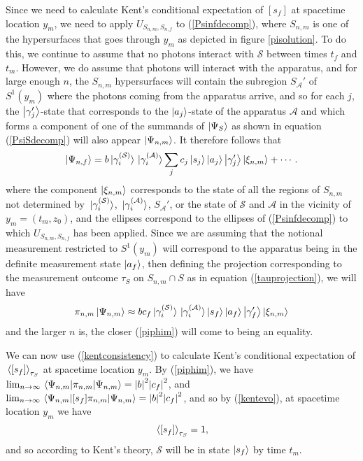Since we need to calculate Kent's conditional expectation of $[s_f]$ at spacetime location $y_m$, we need to apply  $U_{S_{n,m},S_{n,f}}$ to (\ref{Psinfdecomp}), where $S_{n,m}$ is one of the hypersurfaces that goes through $y_m$ as depicted in figure \ref{pisolution}. To do this, we continue to assume that no photons interact with $\mathcal{S}$ between times $t_f$ and $t_m$. However, we do assume that photons will interact with the apparatus, and for large enough $n$, the $S_{n,m}$ hypersurfaces will contain the subregion $S_{\mathcal{A}}'$ of $S^1(y_m)$ where the photons coming from the apparatus arrive, and so for each $j$, the $\ket{\gamma_j'}$-state that corresponds to the $\ket{a_j}$-state of the apparatus $\mathcal{A}$ and which forms a component of one of the summands of $\ket{\Psi_S}$ as shown in equation (\ref{PsiSdecomp}) will also appear $\ket{\Psi_{n,m}}$. It therefore follows that 
\begin{equation}\label{Psinfdecomp}
	\ket{\Psi_{n,f}}=b\ket*{\gamma_i^{(\mathcal{S})}}\ket*{\gamma_i^{(\mathcal{A})}}\sum_j c_j \ket{s_j}\ket{a_j}\ket{\gamma_j'}\ket{\xi_{n,m}}+\cdots.
\end{equation} 
where the component $\ket{\xi_{n,m}}$ corresponds to the state of all the regions of $S_{n,m}$ not determined by $\ket*{\gamma_i^{(\mathcal{S})}}$, $\ket*{\gamma_i^{(\mathcal{A})}}$,  $S_{\mathcal{A}}'$, or the state of $\mathcal{S}$ and $\mathcal{A}$ in the vicinity of $y_m=(t_m, z_0)$, and the ellipses correspond to the ellipses of (\ref{Psinfdecomp}) to which $U_{S_{n,m},S_{n,f}}$ has been applied. Since we are assuming that the notional measurement restricted to $S^1(y_m)$ will correspond to the apparatus being in the definite measurement state $\ket{a_f}$, then defining the projection corresponding to the measurement outcome $\tau_S$ on $S_{n,m}\cap S$ as in equation (\ref{tauprojection}), we will have
\begin{equation}\label{piphim}
\pi_{n,m}\ket{\Psi_{n,m}}\approx b c_f \ket*{\gamma_i^{(\mathcal{S})}}\ket*{\gamma_i^{(\mathcal{A})}}\ket{s_f}\ket{a_f}\ket{\gamma_f'}\ket{\xi_{n,m}}
\end{equation}
and the larger $n$ is, the closer (\ref{piphim}) will come to being an equality. 

We can now use (\ref{kentconsistency}) to calculate Kent's conditional expectation of $\ev*{[s_f]}_{\tau_S}$ at spacetime location $y_m$. By (\ref{piphim}), we have  $\lim_{n\rightarrow\infty}\ev*{\pi_{n,m}}{\Psi_{n,m}}=\abs{b}^2 \abs{c_f}^2 $, and $\lim_{n\rightarrow\infty}\ev*{[s_f] \pi_{n,m}}{\Psi_{n,m}}=\abs{b}^2 \abs{c_f}^2 $, and so by (\ref{kentevo}), at spacetime location $y_m$ we have
$$ \ev*{[s_f]}_{\tau_S}=1,$$
and so according to Kent's theory, $\mathcal{S}$ will be in state $\ket{s_f}$ by time $t_m$.

